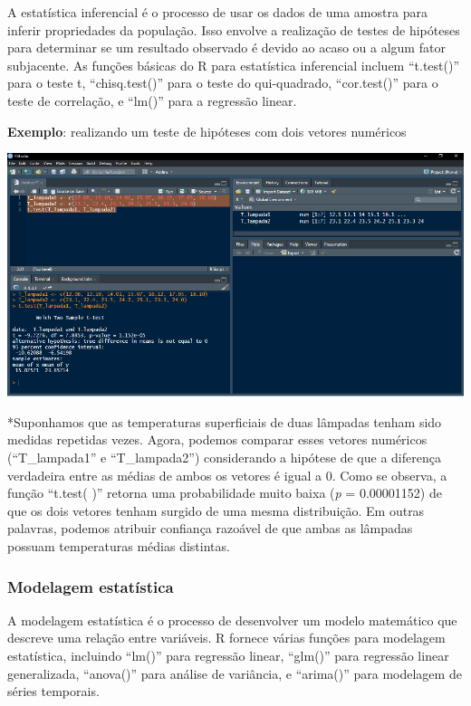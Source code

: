 \documentclass[
]{book}
\begin{document}
A estatística inferencial é o processo de usar os dados de uma amostra para inferir propriedades da população. Isso envolve a realização de testes de hipóteses para determinar se um resultado observado é devido ao acaso ou a algum fator subjacente. As funções básicas do R para estatística inferencial incluem ``t.test()'' para o teste t, ``chisq.test()'' para o teste do qui-quadrado, ``cor.test()'' para o teste de correlação, e ``lm()'' para a regressão linear.

\textbf{Exemplo}: realizando um teste de hipóteses com dois vetores numéricos

\includegraphics{images/clipboard-2899251105.png}

*Suponhamos que as temperaturas superficiais de duas lâmpadas tenham sido medidas repetidas vezes. Agora, podemos comparar esses vetores numéricos (``T\_lampada1'' e ``T\_lampada2'') considerando a hipótese de que a diferença verdadeira entre as médias de ambos os vetores é igual a 0. Como se observa, a função ``t.test( )'' retorna uma probabilidade muito baixa (\emph{p} = 0.00001152) de que os dois vetores tenham surgido de uma mesma distribuição. Em outras palavras, podemos atribuir confiança razoável de que ambas as lâmpadas possuam temperaturas médias distintas.

\subsubsection{Modelagem estatística}\label{modelagem-estatuxedstica}

A modelagem estatística é o processo de desenvolver um modelo matemático que descreve uma relação entre variáveis. R fornece várias funções para modelagem estatística, incluindo ``lm()'' para regressão linear, ``glm()'' para regressão linear generalizada, ``anova()'' para análise de variância, e ``arima()'' para modelagem de séries temporais.
\end{document}
